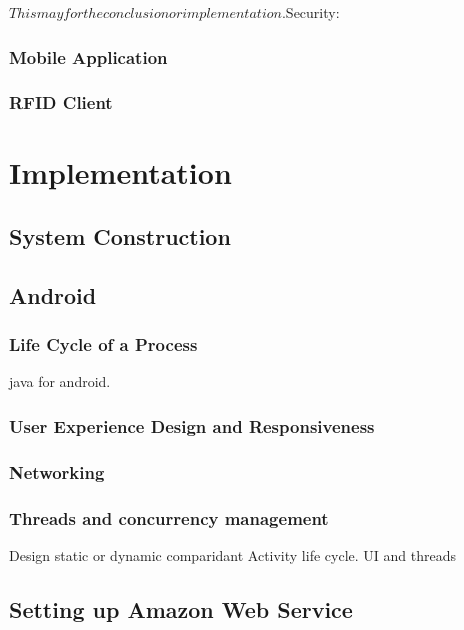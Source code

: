 \documentclass[a4paper, 11pt]{article}
\begin{document}
\(This may for the conclusion or implementation.\)Security:

\subsubsection{Mobile Application} 

\subsubsection{RFID Client} %

\section{Implementation}

\subsection{System Construction}
\subsection{Android} 

\subsubsection{Life Cycle of a Process}
java for android.

\subsubsection{User Experience Design and Responsiveness}

\subsubsection{Networking}

\subsubsection{Threads and concurrency management}
Design static or dynamic comparidant
Activity life cycle.
UI and threads

\subsection{Setting up Amazon Web Service}
\end{document}
